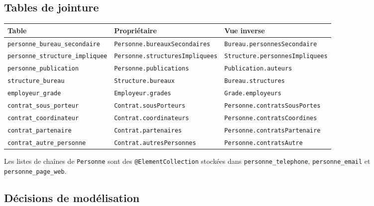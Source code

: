 \documentclass[a4paper,11pt]{article}
\newcommand{\code}[1]{\texttt{#1}}
\begin{document}
\subsection{Tables de jointure}

\begin{center}\footnotesize
\begin{tabular}{@{}lll@{}}
\toprule
\textbf{Table} & \textbf{Propriétaire} & \textbf{Vue inverse} \\
\midrule
\code{personne\_bureau\_secondaire} & \code{Personne.bureauxSecondaires} & \code{Bureau.personnesSecondaire} \\
\code{personne\_structure\_impliquee} & \code{Personne.structuresImpliquees} & \code{Structure.personnesImpliquees} \\
\code{personne\_publication} & \code{Personne.publications} & \code{Publication.auteurs} \\
\code{structure\_bureau} & \code{Structure.bureaux} & \code{Bureau.structures} \\
\code{employeur\_grade} & \code{Employeur.grades} & \code{Grade.employeurs} \\
\code{contrat\_sous\_porteur} & \code{Contrat.sousPorteurs} & \code{Personne.contratsSousPortes} \\
\code{contrat\_coordinateur} & \code{Contrat.coordinateurs} & \code{Personne.contratsCoordines} \\
\code{contrat\_partenaire} & \code{Contrat.partenaires} & \code{Personne.contratsPartenaire} \\
\code{contrat\_autre\_personne} & \code{Contrat.autresPersonnes} & \code{Personne.contratsAutre} \\
\bottomrule
\end{tabular}
\end{center}

Les listes de chaînes de \code{Personne} sont des \code{@ElementCollection}
stockées dans \code{personne\_telephone}, \code{personne\_email} et
\code{personne\_page\_web}.

\subsection{Décisions de modélisation}
\end{document}
